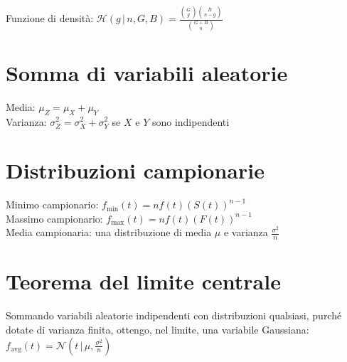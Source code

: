 \documentclass[10pt,landscape]{article}
\begin{document}
\begin{multicols}{3}
\vspace{1em}

Funzione di densità: $\displaystyle \mathcal{H}(g \, | \, n, G, B) = \frac{\binom{G}{g}\binom{B}{n - g}}{\binom{G + B}{n}}$ \\

\section{Somma di variabili aleatorie}
Media: $\mu_Z = \mu_X + \mu_Y$ \\
Varianza: $\sigma_Z^2 = \sigma_X^2 + \sigma_Y^2$ se $X$ e $Y$ sono indipendenti \\

\section{Distribuzioni campionarie}
Minimo campionario: $f_{\text{min}}(t) = n f(t) \left ( S \left( t \right) \right)^{n - 1}$ \\
Massimo campionario: $f_{\text{max}}(t) = n f(t) \left ( F \left( t \right) \right)^{n - 1}$ \\
Media campionaria: una distribuzione di media $\mu$ e varianza $\frac{\sigma^2}{n}$ \\

\section{Teorema del limite centrale}
Sommando variabili aleatorie indipendenti con distribuzioni qualsiasi, purché dotate di varianza finita, ottengo, nel limite, una variabile Gaussiana: $f_{\text{avg}}(t) = \mathcal{N}\left( t \, | \, \mu, \frac{\sigma^2}{n} \right)$ \\


\end{multicols}
\end{document}
